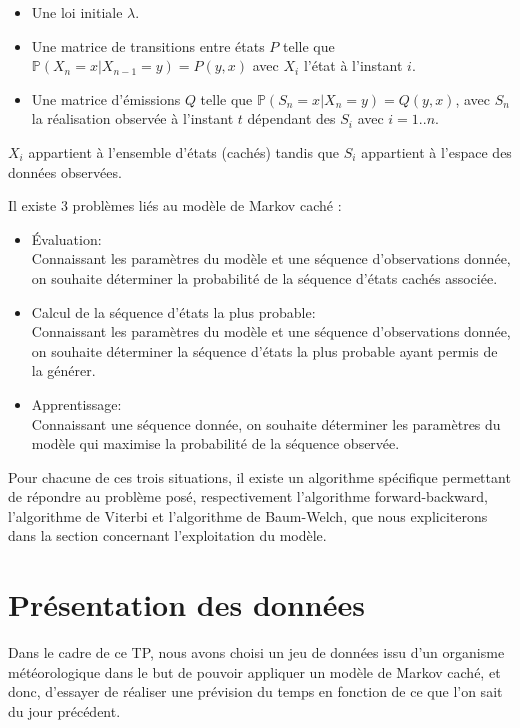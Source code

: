 \documentclass{article}
\begin{document}
\begin{multicols}{2}
\begin{itemize}
    \item Une loi initiale $\lambda$.
    \item Une matrice de transitions entre états $P$ telle que
        $\mathbb{P}(X_n = x|X_{n - 1} = y) = P(y, x)$ avec $X_i$ l’état à
        l’instant $i$.
    \item Une matrice d’émissions $Q$ telle que
        $\mathbb{P}(S_n = x|X_n = y) = Q(y, x)$, avec $S_n$ la réalisation
        observée à l’instant $t$ dépendant des $S_i$ avec $i = 1..n$.
\end{itemize}

$X_i$ appartient à l’ensemble d’états (cachés) tandis que $S_i$ appartient à
l’espace des données observées.

Il existe 3 problèmes liés au modèle de Markov caché :

\begin{itemize}
    \item Évaluation: \\
        Connaissant les paramètres du modèle et une séquence d’observations
        donnée, on souhaite déterminer la probabilité de la séquence d'états
        cachés associée.
    \item Calcul de la séquence d'états la plus probable: \\
        Connaissant les paramètres du modèle et une séquence d’observations
        donnée, on souhaite déterminer la séquence d’états la plus probable
        ayant permis de la générer.
    \item Apprentissage: \\
        Connaissant une séquence donnée, on souhaite déterminer les paramètres
        du modèle qui maximise la probabilité de la séquence observée.
\end{itemize}

Pour chacune de ces trois situations, il existe un algorithme spécifique
permettant de répondre au problème posé, respectivement l’algorithme
forward-backward, l’algorithme de Viterbi et l’algorithme de Baum-Welch, que
nous expliciterons dans la section concernant l’exploitation du modèle.

\section{Présentation des données}\label{sec:donnees}

Dans le cadre de ce TP, nous avons choisi un jeu de données issu d’un organisme
météorologique dans le but de pouvoir appliquer un modèle de Markov caché, et
donc, d’essayer de réaliser une prévision du temps en fonction de ce que l’on
sait du jour précédent.


\end{multicols}
\end{document}
